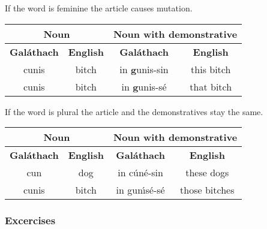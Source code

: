 If the word is feminine the article causes mutation.
\begin{table}[H]
\centering
\begin{tabular}{cccc}
  \toprule
  \multicolumn{2}{c}{\textbf{Noun}} & \multicolumn{2}{c}{\textbf{Noun with demonstrative}}\\
  \midrule
  \textbf{Gal\'{a}thach} & \textbf{English} & \textbf{Gal\'{a}thach} & \textbf{English}\\
  \cmidrule(lr){1-1}\cmidrule(lr){2-2}\cmidrule(lr){3-3}\cmidrule(lr){4-4}
  cunis & bitch & in \textbf{g}unis-sin & this bitch\\
  cunis & bitch & in \textbf{g}unis-s\'{e} & that bitch\\
  \bottomrule
\end{tabular}
\label{examples_demonstrative_mutation}
\end{table}

If the word is plural the article and the demonstratives stay the same.
\begin{table}[H]
\centering
\begin{tabular}{cccc}
  \toprule
  \multicolumn{2}{c}{\textbf{Noun}} & \multicolumn{2}{c}{\textbf{Noun with demonstrative}}\\
  \midrule
  \textbf{Gal\'{a}thach} & \textbf{English} & \textbf{Gal\'{a}thach} & \textbf{English}\\
  \cmidrule(lr){1-1}\cmidrule(lr){2-2}\cmidrule(lr){3-3}\cmidrule(lr){4-4}
  cun & dog & in c\'{u}n\'{e}-sin & these dogs\\
  cunis & bitch & in gun\'{\i}s\'{e}-s\'{e} & those bitches\\
  \bottomrule
\end{tabular}
\label{examples_demonstrative_plural}
\end{table}

\newpage
\subsubsection{Excercises}

